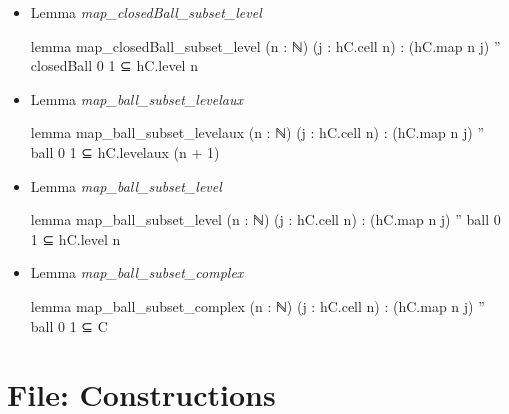 \documentclass[colorinlistoftodos]{article}
\begin{document}
\begin{itemize}
  \item Lemma \emph{map\_closedBall\_subset\_level}
\begin{leancode}
lemma map_closedBall_subset_level (n : ℕ) (j : hC.cell n) : 
  (hC.map n j) '' closedBall 0 1 ⊆ hC.level n
\end{leancode}
  \item Lemma \emph{map\_ball\_subset\_levelaux}
\begin{leancode}
lemma map_ball_subset_levelaux (n : ℕ) (j : hC.cell n) : 
  (hC.map n j) '' ball 0 1 ⊆ hC.levelaux (n + 1)
\end{leancode}
  \item Lemma \emph{map\_ball\_subset\_level}
\begin{leancode}
lemma map_ball_subset_level (n : ℕ) (j : hC.cell n) : 
  (hC.map n j) '' ball 0 1 ⊆ hC.level n
\end{leancode}
  \item Lemma \emph{map\_ball\_subset\_complex}
\begin{leancode}
lemma map_ball_subset_complex (n : ℕ) (j : hC.cell n) : 
  (hC.map n j) '' ball 0 1 ⊆ C
\end{leancode}
\end{itemize}

\section{File: Constructions}
\end{document}
